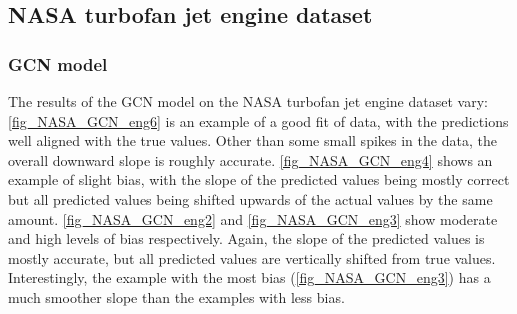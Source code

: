 \documentclass[12pt]{article}
\begin{document}
\subsection{NASA turbofan jet engine dataset}
\subsubsection{GCN model}
The results of the GCN model on the NASA turbofan jet engine dataset vary: \autoref{fig_NASA_GCN_eng6} is an example of a good fit of data, with the predictions well aligned with the true values. Other than some small spikes in the data, the overall downward slope is roughly accurate. \autoref{fig_NASA_GCN_eng4} shows an example of slight bias, with the slope of the predicted values being mostly correct but all predicted values being shifted upwards of the actual values by the same amount. \autoref{fig_NASA_GCN_eng2} and \autoref{fig_NASA_GCN_eng3} show moderate and high levels of bias respectively. Again, the slope of the predicted values is mostly accurate, but all predicted values are vertically shifted from true values. Interestingly, the example with the most bias (\autoref{fig_NASA_GCN_eng3}) has a much smoother slope than the examples with less bias. 
\end{document}
